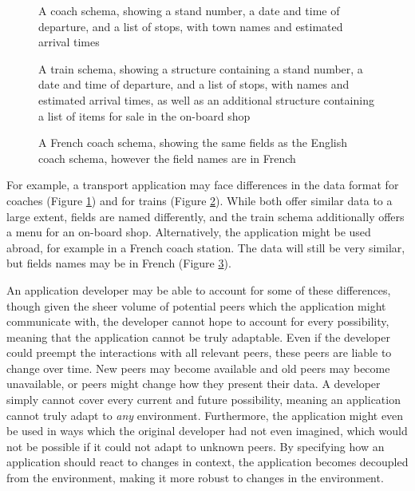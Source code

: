 \documentclass[12pt,twoside,notitlepage]{report}
\begin{document}
\begin{figure}

\caption[Example Schema for a Coach]{A coach schema, showing a stand number, a date and time of departure, and a list of stops, with town names and estimated arrival times}
\label{fig:coach-schema-intro}
\end{figure}

\begin{figure}

\caption[Example Schema for a Train]{A train schema, showing a structure containing a stand number, a date and time of departure, and a list of stops, with names and estimated arrival times, as well as an additional structure containing a list of items for sale in the on-board shop}
\label{fig:train-schema-intro}
\end{figure}

\begin{figure}

\caption[Example Schema for a French Coach]{A French coach schema, showing the same fields as the English coach schema, however the field names are in French}
\label{fig:french-coach-schema-intro}
\end{figure}

For example, a transport application may face differences in the data format for coaches (Figure \ref{fig:coach-schema-intro}) and for trains (Figure \ref{fig:train-schema-intro}). 
While both offer similar data to a large extent, fields are named differently, and the train schema additionally offers a menu for an on-board shop.
Alternatively, the application might be used abroad, for example in a French coach station. The data will still be very similar, but fields names may be in French (Figure \ref{fig:french-coach-schema-intro}).

An application developer may be able to account for some of these differences, though given the sheer volume of potential peers which the application might communicate with, the developer cannot hope to account for every possibility, meaning that the application cannot be truly adaptable. 
Even if the developer could preempt the interactions with all relevant peers, these peers are liable to change over time. 
New peers may become available and old peers may become unavailable, or peers might change how they present their data. 
A developer simply cannot cover every current and future possibility, meaning an application cannot truly adapt to {\sl any} environment. 
Furthermore, the application might even be used in ways which the original developer had not even imagined, which would not be possible if it could not adapt to unknown peers. 
By specifying how an application should react to changes in context, the application becomes decoupled from the environment, making it more robust to changes in the environment. 
\end{document}
